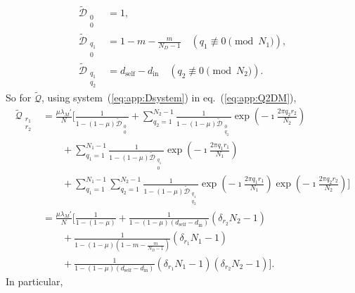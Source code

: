 \documentclass[11pt, letterpaper]{article}
\renewcommand{\eqref}[1]{\textup{{\normalfont eq.~(\ref{#1}}\normalfont)}}
\newcommand{\sysref}[1]{system~(\ref{#1})}
\newcommand{\self}{\textrm{self}}
\newcommand{\inn}{\textrm{in}}
\newcommand{\din}{d_{\inn}}
\newcommand{\dself}{d_{\self}}
\newcommand{\ndemes}{N_D}
\begin{document}
%
\begin{subequations}\label{eq:app:Dsystem}
\begin{align}
\tilde{\mathcal{D}}_{\substack{0\\0}} & = 1,\\
%
\tilde{\mathcal{D}}_{\substack{q_1\\0}} & = 1-m -  \frac{m}{\ndemes-1} \quad (q_1 \not \equiv 0 \pmod{N_1}),\\
%
\tilde{\mathcal{D}}_{\substack{q_1\\q_2}} & = \dself - \din \quad (q_2 \not \equiv 0 \pmod{N_2}).
\end{align}
\end{subequations}
%
So for $\tilde{\mathcal{Q}}$, using \sysref{eq:app:Dsystem} in \eqref{eq:app:Q2DM}, 
%
\begin{align}
\tilde{\mathcal{Q}}_{\substack{r_1\\r_2}}&= \frac{\mu \lambda_M'}{N} \Bigg[  \frac{1}{1 - (1-\mu) \tilde{\mathcal{D}}_{\substack{0\\ 0}}} + \sum_{q_2 = 1}^{N_2-1}\frac{1}{1 - (1-\mu) \tilde{\mathcal{D}}_{\substack{0\\ q_2}}} \exp\left(-\imath \frac{2\pi q_2 r_2}{N_2}\right) \nonumber \\
& \qquad 
+ \sum_{q_1 =1}^{N_1 - 1} \frac{1}{1 - (1-\mu) \tilde{\mathcal{D}}_{\substack{q_1\\ 0}}} \exp\left(-\imath \frac{2\pi q_1 r_1}{N_1}\right) \nonumber \\
& \qquad 
+ 
 \sum_{q_1=1}^{N_1 -1} \sum_{q_2=1}^{N_2 -1} \frac{1}{1 - (1-\mu) \tilde{\mathcal{D}}_{\substack{q_1\\ q_2}}} \exp\left(-\imath \frac{2\pi q_1 r_1}{N_1}\right)\exp\left(-\imath \frac{2\pi q_2 r_2}{N_2}\right) \Bigg]\nonumber \\
& = \frac{\mu \lambda_M'}{N} \Bigg[  \frac{1}{1 - (1-\mu) } 
+ \frac{1}{1 - (1-\mu) (\dself - \din)} (\delta_{r_2} N_2 - 1) \nonumber \\
& \qquad 
+  \frac{1}{1 - (1-\mu) (1-m-\frac{m}{\ndemes-1})} (\delta_{r_1} N_1 - 1) \nonumber \\
& \qquad 
+ 
\frac{1}{1 - (1-\mu) (\dself - \din) } (\delta_{r_1} N_1 - 1) (\delta_{r_2} N_2 - 1) \Bigg].\label{eq:app:Q2DMsol}
% 
\end{align}
In particular, 
\end{document}
